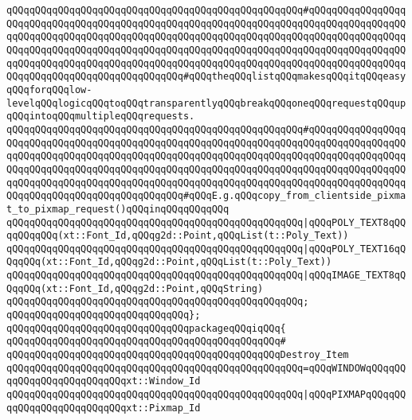 \verb|qQQqqQQqqQQqqQQqqQQqqQQqqQQqqQQqqQQqqQQqqQQqqQQqqQQq#qQQqqQQqqQQqqQQqqQQqqQQqqQQqqQQqqQQqqQQqqQQqqQQqqQQqqQQqqQQqqQQqqQQqqQQqqQQqqQQqqQQqqQQqqQQqqQQqqQQqqQQqqQQqqQQqqQQqqQQqqQQqqQQqqQQqqQQqqQQqqQQqqQQqqQQqqQQqqQQqqQQqqQQqqQQqqQQqqQQqqQQqqQQqqQQqqQQqqQQqqQQqqQQqqQQqqQQqqQQqqQQqqQQqqQQqqQQqqQQqqQQqqQQqqQQqqQQqqQQqqQQqqQQqqQQqqQQqqQQqqQQqqQQqqQQqqQQqqQQqqQQqqQQqqQQqqQQqqQQqqQQqqQQq#qQQqtheqQQqlistqQQqmakesqQQqitqQQqeasyqQQqforqQQqlow-levelqQQqlogicqQQqtoqQQqtransparentlyqQQqbreakqQQqoneqQQqrequestqQQqupqQQqintoqQQqmultipleqQQqrequests.|\newline
\verb|qQQqqQQqqQQqqQQqqQQqqQQqqQQqqQQqqQQqqQQqqQQqqQQqqQQq#qQQqqQQqqQQqqQQqqQQqqQQqqQQqqQQqqQQqqQQqqQQqqQQqqQQqqQQqqQQqqQQqqQQqqQQqqQQqqQQqqQQqqQQqqQQqqQQqqQQqqQQqqQQqqQQqqQQqqQQqqQQqqQQqqQQqqQQqqQQqqQQqqQQqqQQqqQQqqQQqqQQqqQQqqQQqqQQqqQQqqQQqqQQqqQQqqQQqqQQqqQQqqQQqqQQqqQQqqQQqqQQqqQQqqQQqqQQqqQQqqQQqqQQqqQQqqQQqqQQqqQQqqQQqqQQqqQQqqQQqqQQqqQQqqQQqqQQqqQQqqQQqqQQqqQQqqQQqqQQqqQQqqQQq#qQQqE.g.qQQqcopy_from_clientside_pixmat_to_pixmap_request()qQQqinqQQqqQQqqQQq|\newline
\verb|qQQqqQQqqQQqqQQqqQQqqQQqqQQqqQQqqQQqqQQqqQQqqQQqqQQq|\verb#|qQQqPOLY_TEXT8qQQqqQQqqQQq(xt::Font_Id,qQQqg2d::Point,qQQqList(t::Poly_Text))#\newline
\verb|qQQqqQQqqQQqqQQqqQQqqQQqqQQqqQQqqQQqqQQqqQQqqQQqqQQq|\verb#|qQQqPOLY_TEXT16qQQqqQQq(xt::Font_Id,qQQqg2d::Point,qQQqList(t::Poly_Text))#\newline
\verb|qQQqqQQqqQQqqQQqqQQqqQQqqQQqqQQqqQQqqQQqqQQqqQQqqQQq|\verb#|qQQqIMAGE_TEXT8qQQqqQQq(xt::Font_Id,qQQqg2d::Point,qQQqString)#\newline
\verb|qQQqqQQqqQQqqQQqqQQqqQQqqQQqqQQqqQQqqQQqqQQqqQQqqQQq;|\newline
\verb|qQQqqQQqqQQqqQQqqQQqqQQqqQQqqQQq};|\newline
\newline
\verb|qQQqqQQqqQQqqQQqqQQqqQQqqQQqqQQqpackageqQQqiqQQq{|\newline
\verb|qQQqqQQqqQQqqQQqqQQqqQQqqQQqqQQqqQQqqQQqqQQqqQQq#|\newline
\verb|qQQqqQQqqQQqqQQqqQQqqQQqqQQqqQQqqQQqqQQqqQQqqQQqDestroy_Item|\newline
\verb|qQQqqQQqqQQqqQQqqQQqqQQqqQQqqQQqqQQqqQQqqQQqqQQqqQQq=qQQqWINDOWqQQqqQQqqQQqqQQqqQQqqQQqqQQqxt::Window_Id|\newline
\verb|qQQqqQQqqQQqqQQqqQQqqQQqqQQqqQQqqQQqqQQqqQQqqQQqqQQq|\verb#|qQQqPIXMAPqQQqqQQqqQQqqQQqqQQqqQQqqQQqxt::Pixmap_Id#\newline

